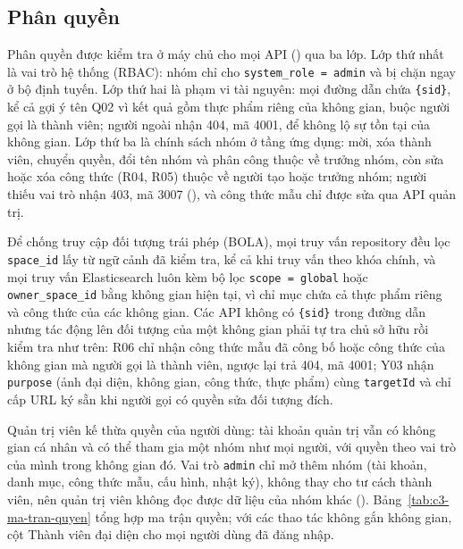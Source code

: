 \subsection{Phân quyền}\label{ssec:phan-quyen}

Phân quyền được kiểm tra ở máy chủ cho mọi API () qua ba lớp. Lớp thứ nhất là vai trò hệ thống (RBAC): nhóm  chỉ cho \texttt{system\_role = admin} và bị chặn ngay ở bộ định tuyến. Lớp thứ hai là phạm vi tài nguyên: mọi đường dẫn chứa \texttt{\{sid\}}, kể cả gợi ý tên Q02 vì kết quả gồm thực phẩm riêng của không gian, buộc người gọi là thành viên; người ngoài nhận 404, mã 4001, để không lộ sự tồn tại của không gian. Lớp thứ ba là chính sách nhóm ở tầng ứng dụng: mời, xóa thành viên, chuyển quyền, đổi tên nhóm và phân công thuộc về trưởng nhóm, còn sửa hoặc xóa công thức (R04, R05) thuộc về người tạo hoặc trưởng nhóm; người thiếu vai trò nhận 403, mã 3007 (), và công thức mẫu chỉ được sửa qua API quản trị.

Để chống truy cập đối tượng trái phép (BOLA), mọi truy vấn repository đều lọc \texttt{space\_id} lấy từ ngữ cảnh đã kiểm tra, kể cả khi truy vấn theo khóa chính, và mọi truy vấn Elasticsearch luôn kèm bộ lọc \texttt{scope = global} hoặc \texttt{owner\_space\_id} bằng không gian hiện tại, vì chỉ mục chứa cả thực phẩm riêng và công thức của các không gian. Các API không có \texttt{\{sid\}} trong đường dẫn nhưng tác động lên đối tượng của một không gian phải tự tra chủ sở hữu rồi kiểm tra như trên: R06 chỉ nhận công thức mẫu đã công bố hoặc công thức của không gian mà người gọi là thành viên, ngược lại trả 404, mã 4001; Y03 nhận \texttt{purpose} (ảnh đại diện, không gian, công thức, thực phẩm) cùng \texttt{targetId} và chỉ cấp URL ký sẵn khi người gọi có quyền sửa đối tượng đích.

Quản trị viên kế thừa quyền của người dùng: tài khoản quản trị vẫn có không gian cá nhân và có thể tham gia một nhóm như mọi người, với quyền theo vai trò của mình trong không gian đó. Vai trò \texttt{admin} chỉ mở thêm nhóm  (tài khoản, danh mục, công thức mẫu, cấu hình, nhật ký), không thay cho tư cách thành viên, nên quản trị viên không đọc được dữ liệu của nhóm khác (). Bảng~\ref{tab:c3-ma-tran-quyen} tổng hợp ma trận quyền; với các thao tác không gắn không gian, cột Thành viên đại diện cho mọi người dùng đã đăng nhập.

